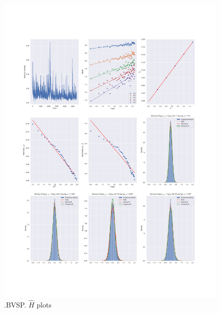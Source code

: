 	\begin{figure}[h]
		\centering
		\includegraphics[width=\linewidth]{fig/.BVSP.pdf}
		\caption{.BVSP. $\hat{H}$ plots}
	\end{figure}

